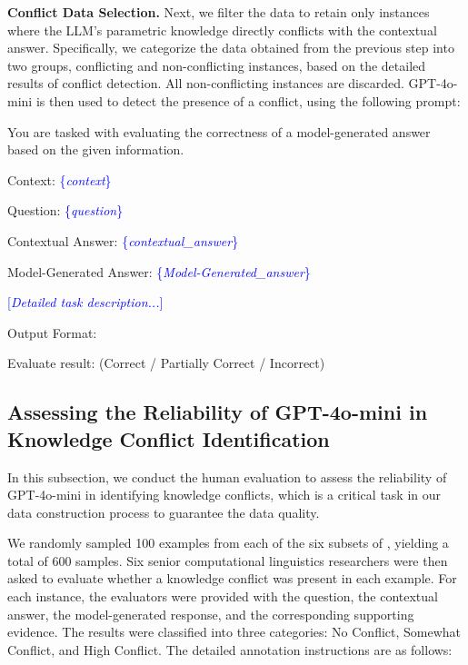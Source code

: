 \textbf{Conflict Data Selection.} Next, we filter the data to retain only instances where the LLM's parametric knowledge directly conflicts with the contextual answer. Specifically, we categorize the data obtained from the previous step into two groups, conflicting and non-conflicting instances, based on the detailed results of conflict detection. All non-conflicting instances are discarded. GPT-4o-mini is then used to detect the presence of a conflict, using the following prompt:

\begin{tcolorbox}
[title=Prompt for identifying conflict knowledge,colback=blue!10,colframe=blue!50!black,arc=1mm,boxrule=1pt,left=1mm,right=1mm,top=1mm,bottom=1mm]
\small
You are tasked with evaluating the correctness of a model-generated answer based on the given information. 

\small
Context: \textcolor{blue}{\{\textit{context}\}}

Question: \textcolor{blue}{\{\textit{question}\}}

Contextual Answer: \textcolor{blue}{\{\textit{contextual\_answer}\}}

Model-Generated Answer: \textcolor{blue}{\{\textit{Model-Generated\_answer}\}}

\textcolor{blue}{[\textit{Detailed task description...}]}

Output Format:

Evaluate result: (Correct / Partially Correct / Incorrect) 
\end{tcolorbox}




\subsection{Assessing the Reliability of GPT-4o-mini in Knowledge Conflict Identification}
\label{append:human_eval}
In this subsection, we conduct the human evaluation to assess the reliability of GPT-4o-mini in identifying knowledge conflicts, which is a critical task in our data construction process to guarantee the data quality.

We randomly sampled 100 examples from each of the six subsets of \dataset{}, yielding a total of 600 samples. Six senior computational linguistics researchers were then asked to evaluate whether a knowledge conflict was present in each example. For each instance, the evaluators were provided with the question, the contextual answer, the model-generated response, and the corresponding supporting evidence. The results were classified into three categories: No Conflict, Somewhat Conflict, and High Conflict. The detailed annotation instructions are as follows:

